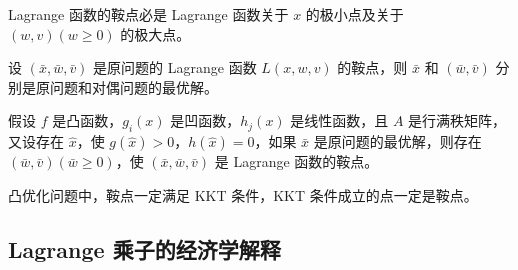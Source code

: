 \begin{theorem}
    Lagrange 函数的鞍点必是 Lagrange 函数关于 $x$ 的极小点及关于 $(w, v)(w \ge 0)$ 的极大点。
\end{theorem}

\begin{theorem}[鞍点定理]
    设 $(\bar{x}, \bar{w}, \bar{v})$ 是原问题的 Lagrange 函数 $L(x, w, v)$ 的鞍点，则 $\bar{x}$ 和 $(\bar{w}, \bar{v})$ 分别是原问题和对偶问题的最优解。
\end{theorem}

\begin{theorem}[鞍点定理]
    假设 $f$ 是凸函数，$g_i(x)$ 是凹函数，$h_j(x)$ 是线性函数，且 $A$ 是行满秩矩阵，又设存在 $\hat{x}$，使 $g(\hat{x}) > 0$，$h(\hat{x}) = 0$，如果 $\bar{x}$ 是原问题的最优解，则存在 $(\bar{w}, \bar{v})(\bar{w} \ge 0)$，使 $(\bar{x}, \bar{w}, \bar{v})$ 是 Lagrange 函数的鞍点。
\end{theorem}

\begin{theorem}
    凸优化问题中，鞍点一定满足 KKT 条件，KKT 条件成立的点一定是鞍点。
\end{theorem}

\subsection{Lagrange 乘子的经济学解释}
